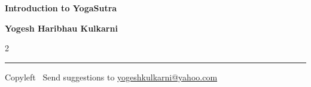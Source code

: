 \documentclass[9pt,a4paper,landscape]{article}
\begin{document}
\footnotesize


\begin{center}
\Large{\textbf{Introduction to YogaSutra}}  

\small{\textbf{Yogesh Haribhau Kulkarni}}  
\end{center}

\begin{multicols}{2}

\end{multicols}

\rule{\linewidth}{0.25pt}
\scriptsize
Copyleft \textcopyleft\  Send suggestions to 
\href{http://www.yogeshkulkarni.com}{yogeshkulkarni@yahoo.com}
\end{document}
